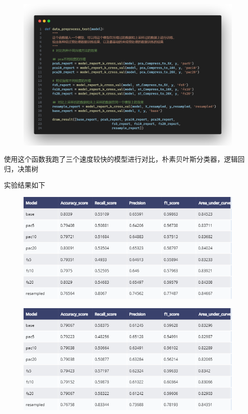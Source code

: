 \documentclass{article}
\begin{document}
\begin{figure}[H]
	\centering
	\includegraphics[width=\textwidth]{./img/data_prepocess_test.png}
\end{figure}

使用这个函数我跑了三个速度较快的模型进行对比，朴素贝叶斯分类器，逻辑回归，决策树

实验结果如下
\begin{figure}[H]
	\centering
	\includegraphics[width=\textwidth]{./img/logit_pre.png}
\end{figure}

\begin{figure}[H]
	\centering
	\includegraphics[width=\textwidth]{./img/dt_pre.png}
\end{figure}
\end{document}

